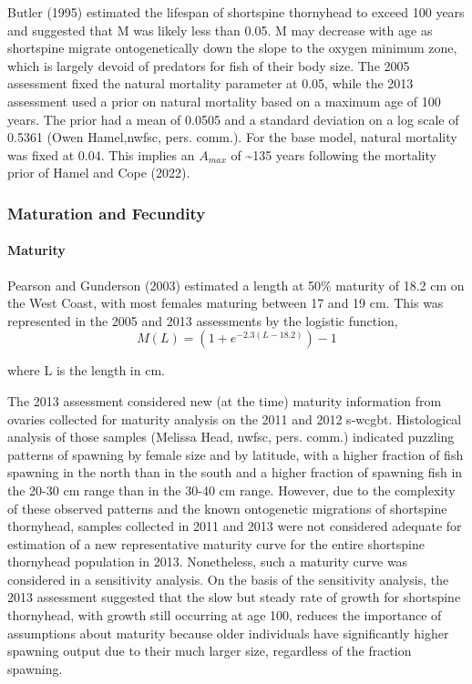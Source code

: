 \documentclass[11pt,
  english,
  letterpaper,
]{article}
\begin{document}
Butler (1995) estimated the lifespan of shortspine thornyhead to exceed 100 years and suggested that M was likely less than 0.05. M may decrease with age as shortspine migrate ontogenetically down the slope to the oxygen minimum zone, which is largely devoid of predators for fish of their body size. The 2005 assessment fixed the natural mortality parameter at 0.05, while the 2013 assessment used a prior on natural mortality based on a maximum age of 100 years. The prior had a mean of 0.0505 and a standard deviation on a log scale of 0.5361 (Owen Hamel,\gls{nwfsc}, pers. comm.). For the base model, natural mortality was fixed at 0.04. This implies an \(A_{max}\) of \textasciitilde135 years following the mortality prior of Hamel and Cope (2022).

\hypertarget{maturation-and-fecundity}{%
\subsubsection{Maturation and Fecundity}\label{maturation-and-fecundity}}

\hypertarget{maturity}{%
\paragraph{Maturity}\label{maturity}}

Pearson and Gunderson (2003) estimated a length at 50\% maturity of 18.2 cm on the West Coast, with most females maturing between 17 and 19 cm. This was represented in the 2005 and 2013 assessments by the logistic function, \begin{equation} M(L) = (1 + e^{-2.3(L-18.2)})-1\end{equation}

where L is the length in cm.

The 2013 assessment considered new (at the time) maturity information from ovaries collected for maturity analysis on the 2011 and 2012 \gls{s-wcgbt}. Histological analysis of those samples (Melissa Head, \gls{nwfsc}, pers. comm.) indicated puzzling patterns of spawning by female size and by latitude, with a higher fraction of fish spawning in the north than in the south and a higher fraction of spawning fish in the 20-30 cm range than in the 30-40 cm range. However, due to the complexity of these observed patterns and the known ontogenetic migrations of shortspine thornyhead, samples collected in 2011 and 2013 were not considered adequate for estimation of a new representative maturity curve for the entire shortspine thornyhead population in 2013. Nonetheless, such a maturity curve was considered in a sensitivity analysis. On the basis of the sensitivity analysis, the 2013 assessment suggested that the slow but steady rate of growth for shortspine thornyhead, with growth still occurring at age 100, reduces the importance of assumptions about maturity because older individuals have significantly higher spawning output due to their much larger size, regardless of the fraction spawning.
\end{document}
